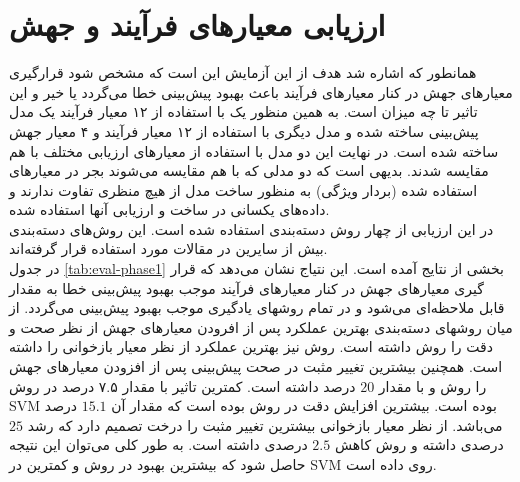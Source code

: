 \section{ارزیابی معیارهای فرآیند و جهش}
همانطور که اشاره شد هدف از این آزمایش این است که مشخص شود قرارگیری معیارهای جهش در کنار معیارهای فرآیند باعث بهبود پیش‌بینی خطا می‌گردد یا خیر و این تاثیر تا چه میزان است. به همین منظور یک با استفاده از ۱۲ معیار فرآیند یک مدل پیش‌بینی ساخته شده و مدل دیگری  با استفاده از ۱۲ معیار فرآیند و ۴ معیار جهش ساخته شده است. در نهایت این دو مدل با استفاده از معیارهای ارزیابی مختلف با هم مقایسه شدند. بدیهی است که دو مدلی که با هم مقایسه می‌شوند بجر در معیارهای استفاده شده (بردار ویژگی) به منظور ساخت مدل از هیچ منظری تفاوت ندارند و داده‌های یکسانی در ساخت و ارزیابی آنها استفاده شده. \\
در این ارزیابی از چهار روش دسته‌بندی استفاده شده است. این روش‌های دسته‌بندی بیش از سایرین در مقالات مورد استفاده قرار گرفته‌اند. \\
در جدول \ref{tab:eval-phase1} بخشی از نتایج آمده است. این نتیاج نشان می‌دهد که قرار گیری معیارهای جهش در کنار معیارهای فرآیند موجب بهبود پیش‌بینی خطا به مقدار قابل ملاحظه‌ای می‌شود و در تمام  روشهای  یادگیری موجب بهبود  پیش‌بینی می‌گردد. از میان روشهای دسته‌بندی بهترین عملکرد   پس از افرودن معیارهای جهش  از نظر صحت و دقت را روش  داشته است. روش    نیز بهترین عملکرد از نظر معیار بازخوانی را  داشته است. همچنین بیشترین تغییر مثبت در صحت پیش‌بینی پس از افزودن معیارهای جهش را روش    و   با مقدار $20$ درصد داشته است.  کمترین تاثیر با مقدار $۷.۵$ درصد در روش SVM بوده است. بیشترین افزایش دقت در روش  بوده است که مقدار آن $15.1$ درصد می‌باشد. از نظر معیار بازخوانی بیشترین تغییر مثبت را درخت تصمیم دارد که رشد $25$ درصدی داشته و روش  کاهش $2.5$ درصدی داشته است. به طور کلی می‌توان این نتیجه حاصل شود که بیشترین بهبود در روش  و کمترین در SVM روی داده است.
